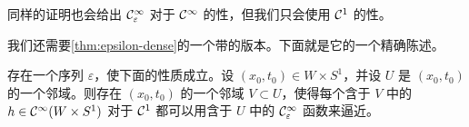 \begin{remark}\label{thm:cinfty-density-remark}
同样的证明也会给出 $\mathcal{C}^{\infty}_{\varepsilon}$ 对于 $\mathcal{C}^{\infty}$ \trTopology{}的\trDense{}性，但我们只会使用 $\mathcal{C}^{1}$ 的\trDense{}性。
\end{remark}

我们还需要\cref{thm:epsilon-dense}的一个带\trCompact{}\trSupport{}的版本。下面就是它的一个精确陈述。

\begin{proposition}\label{thm:compact-support-dense}
存在一个序列 $\varepsilon$，使下面的性质成立。设 $(x_{0},t_{0})\in W\times S^{1}$，并设 $U$ 是 $(x_{0},t_{0})$ 的一个邻域。则存在 $(x_{0},t_{0})$ 的一个邻域 $V\subset U$，使得每个\trSupport{}含于 $V$ 中的 $h\in\mathcal{C}^{\infty}(W\times S^{1})$ 对于 $\mathcal{C}^{1}$ \trTopology{}都可以用\trSupport{}含于 $U$ 中的 $\mathcal{C}^{\infty}_{\varepsilon}$ 函数来逼近。
\end{proposition}

